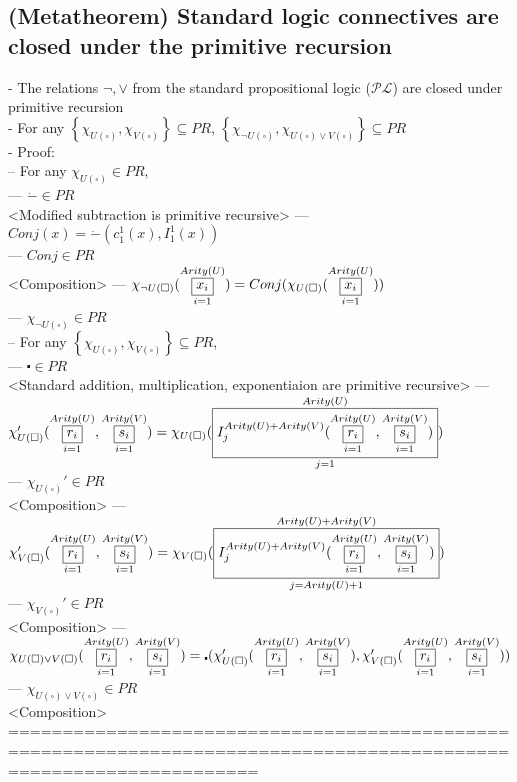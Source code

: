 \documentclass{book}
\newcommand{\placeholder}{\square}
\newcommand{\set}[1]{\left\{ #1 \right\}}
\newcommand{\vdc}[3]{\underset{#2}{\overset{#3}{\fbox{$#1$}}}}
\begin{document}
\subsection{(Metatheorem) Standard logic connectives are closed under the primitive recursion} %
	- The relations $\lnot, \lor$ from the standard propositional logic ($\mathcal{PL}$) are closed under primitive recursion \\
	- For any $\set{\chi_{U(\placeholder)}, \chi_{V(\placeholder)}} \subseteq PR$, $\set{\chi_{\lnot U(\placeholder)}, \chi_{U(\placeholder) \lor V(\placeholder)}} \subseteq PR$ \\
	- Proof: \\
		-- For any $\chi_{U(\placeholder)} \in PR$, \\
			--- $\dot{-} \in PR$ \\ <Modified subtraction is primitive recursive>
			--- $Conj(x) = \dot{-}(c_1^1(x), I_1^1(x))$ \\
			--- $Conj \in PR$ \\ <Composition>
			--- $\chi_{\lnot U(\placeholder)}(\vdc{x_i}{i=1}{Arity(U)}) = Conj(\chi_{U(\placeholder)}(\vdc{x_i}{i=1}{Arity(U)}))$ \\
			--- $\chi_{\lnot U(\placeholder)} \in PR$ \\
		-- For any $\set{\chi_{U(\placeholder)}, \chi_{V(\placeholder)}} \subseteq PR$, \\
			--- $\centerdot \in PR$ \\ <Standard addition, multiplication, exponentiaion are primitive recursive>
			--- $\chi_{U(\placeholder)}'(\vdc{r_i}{i=1}{Arity(U)}, \vdc{s_i}{i=1}{Arity(V)}) = \chi_{U(\placeholder)}(\vdc{I_j^{Arity(U)+Arity(V)}(\vdc{r_i}{i=1}{Arity(U)}, \vdc{s_i}{i=1}{Arity(V)})}{j=1}{Arity(U)})$ \\
			--- $\chi_{U(\placeholder)}' \in PR$ \\ <Composition>
			--- $\chi_{V(\placeholder)}'(\vdc{r_i}{i=1}{Arity(U)}, \vdc{s_i}{i=1}{Arity(V)}) = \chi_{V(\placeholder)}(\vdc{I_j^{Arity(U)+Arity(V)}(\vdc{r_i}{i=1}{Arity(U)}, \vdc{s_i}{i=1}{Arity(V)})}{j=Arity(U)+1}{Arity(U)+Arity(V)})$ \\
			--- $\chi_{V(\placeholder)}' \in PR$ \\ <Composition>
			--- $\chi_{U(\placeholder) \lor V(\placeholder)}(\vdc{r_i}{i=1}{Arity(U)}, \vdc{s_i}{i=1}{Arity(V)}) = \centerdot(\chi_{U(\placeholder)}'(\vdc{r_i}{i=1}{Arity(U)}, \vdc{s_i}{i=1}{Arity(V)}), \chi_{V(\placeholder)}'(\vdc{r_i}{i=1}{Arity(U)}, \vdc{s_i}{i=1}{Arity(V)}))$ \\
			--- $\chi_{U(\placeholder) \lor V(\placeholder)} \in PR$ \\ <Composition>
	===================================================================================================================
\end{document}
